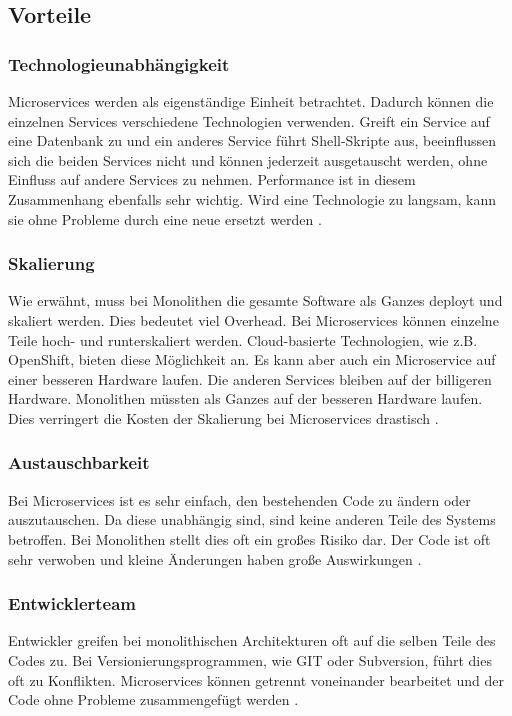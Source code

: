 \subsection{Vorteile}
\subsubsection{Technologieunabhängigkeit}
Microservices werden als eigenständige Einheit betrachtet. Dadurch können die einzelnen Services verschiedene Technologien verwenden. Greift ein Service auf eine Datenbank zu und ein anderes Service führt Shell-Skripte aus, beeinflussen sich die beiden Services nicht und können jederzeit ausgetauscht werden, ohne Einfluss auf andere Services zu nehmen. Performance ist in diesem Zusammenhang ebenfalls sehr wichtig. Wird eine Technologie zu langsam, kann sie ohne Probleme durch eine neue ersetzt werden \cite[Kapitel 1]{Newman2015}.

\subsubsection{Skalierung}
Wie erwähnt, muss bei Monolithen die gesamte Software als Ganzes deployt und skaliert werden. Dies bedeutet viel Overhead. Bei Microservices können einzelne Teile hoch- und runterskaliert werden. Cloud-basierte Technologien, wie z.B. OpenShift, bieten diese Möglichkeit an. Es kann aber auch ein Microservice auf einer besseren Hardware laufen. Die anderen Services bleiben auf der billigeren Hardware. Monolithen müssten als Ganzes auf der besseren Hardware laufen. Dies verringert die Kosten der Skalierung bei Microservices drastisch \cite[Kapitel 1]{Newman2015}.

\subsubsection{Austauschbarkeit}
Bei Microservices ist es sehr einfach, den bestehenden Code zu ändern oder auszutauschen. Da diese unabhängig sind, sind keine anderen Teile des Systems betroffen. Bei Monolithen stellt dies oft ein großes Risiko dar. Der Code ist oft sehr verwoben und kleine Änderungen haben große Auswirkungen \cite[Kapitel 1]{Newman2015}.

\subsubsection{Entwicklerteam}
Entwickler greifen bei monolithischen Architekturen oft auf die selben Teile des Codes zu. Bei Versionierungsprogrammen, wie GIT oder Subversion, führt dies oft zu Konflikten.
Microservices können getrennt voneinander bearbeitet und der Code ohne Probleme zusammengefügt werden \cite[Kapitel 1]{Newman2015}.



